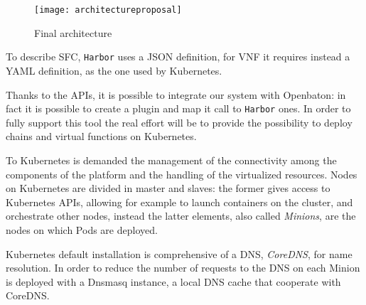 \begin{figure}[H]
  \centering
  \texttt{[image: architectureproposal]}
  \caption{Final architecture}
  \label{chap:archimple:sec:secondattempt:img:attempt2v1harbor}
\end{figure}

To describe SFC, \texttt{Harbor} uses a JSON definition, for VNF it requires
instead a YAML definition, as the one used by Kubernetes. 

Thanks to the APIs, it is possible to integrate our system with Openbaton: in
fact it is possible to create a plugin and map it call to \texttt{Harbor} ones.
In order to fully support this tool the real effort will be to provide the
possibility to deploy chains and virtual functions on Kubernetes. 

To Kubernetes is demanded the management of the connectivity among the
components of the platform and the handling of the virtualized resources.
Nodes on Kubernetes are divided in master and slaves: the former gives access to
Kubernetes APIs, allowing for example to launch containers on the cluster, and
orchestrate other nodes, instead the latter elements, also called
\emph{Minions}, are the nodes on which Pods are deployed.

Kubernetes default installation is comprehensive of a DNS, \emph{CoreDNS}, for
name resolution. In order to reduce the number of requests to the DNS on each
Minion is deployed with a Dnsmasq instance, a local DNS cache that cooperate
with CoreDNS.